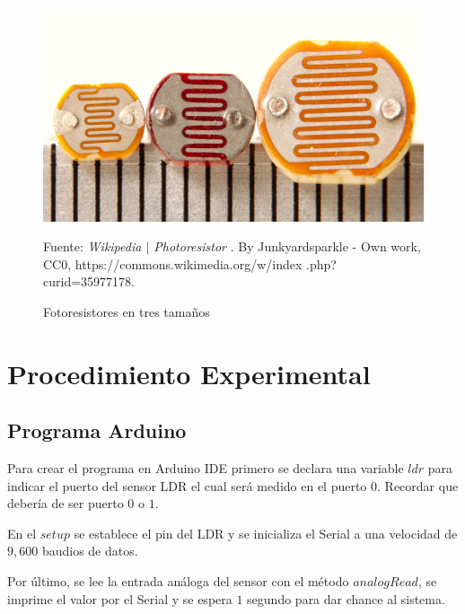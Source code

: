\documentclass{article}
\begin{document}
\begin{figure}[H]
\centering
\includegraphics[width=0.2\paperwidth]{images/ldr-three-sizes.jpg}
\caption{Fotoresistores en tres tamaños}\footnotesize
Fuente: \textit{Wikipedia $\mid$ Photoresistor} \cite{wikipedia-ldr-2022}. By
Junkyardsparkle - Own work, CC0, https://commons.wikimedia.org/w/index
.php?curid=35977178.
\end{figure}

\section{Procedimiento Experimental}

\subsection{Programa Arduino}

Para crear el programa en Arduino IDE primero se declara una variable $ldr$
para indicar el puerto del sensor LDR el cual será medido en el puerto $0$.
Recordar que debería de ser puerto $0$ o $1$.

\bigbreak

En el $setup$ se establece el pin del LDR y se inicializa el Serial a una
velocidad de $9,600$ baudios de datos.

\bigbreak

Por último, se lee la entrada análoga del sensor con el método $analogRead$,
se imprime el valor por el Serial y se espera $1$ segundo para dar chance al
sistema.
\end{document}
